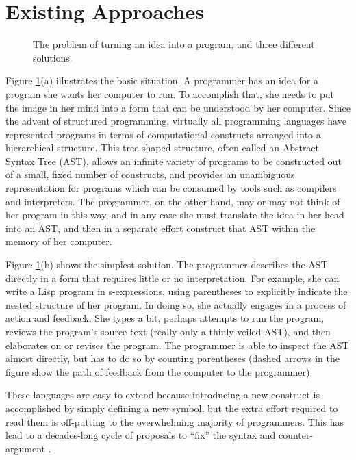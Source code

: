 \section{Existing Approaches}

\begin{figure}[h]
  \centering
  

  \caption{The problem of turning an idea into a program, and three different solutions.}
  \label{fig-1}
\end{figure}

Figure \ref{fig-1}(a) illustrates the basic situation. A programmer has an idea for a program she wants her computer to run. To accomplish that, she needs to put the image in her mind into a form that can be understood by her computer. Since the advent of structured programming, virtually all programming languages have represented programs in terms of computational constructs arranged into a hierarchical structure. This tree-shaped structure, often called an Abstract Syntax Tree (AST), allows an infinite variety of programs to be constructed out of a small, fixed number of constructs, and provides an unambiguous representation for programs which can be consumed by tools such as compilers and interpreters. The programmer, on the other hand, may or may not think of her program in this way, and in any case she must translate the idea in her head into an AST, and then in a separate effort construct that AST within the memory of her computer.

Figure \ref{fig-1}(b) shows the simplest solution. The programmer describes the AST directly in a form that requires little or no interpretation. For example, she can write a Lisp program in s-expressions, using parentheses to explicitly indicate the nested structure of her program. In doing so, she actually engages in a process of action and feedback. She types a bit, perhaps attempts to run the program, reviews the program's source text (really only a thinly-veiled AST), and then elaborates on or revises the program. The programmer is able to inspect the AST almost directly, but has to do so by counting parentheses (dashed arrows in the figure show the path of feedback from the computer to the programmer).

These languages are easy to extend because introducing a new construct is accomplished by simply defining a new symbol, but the extra effort required to read them is off-putting to the overwhelming majority of programmers. This has lead to a decades-long cycle of proposals to ``fix'' the syntax and counter-argument \cite{lisp-hated}.

